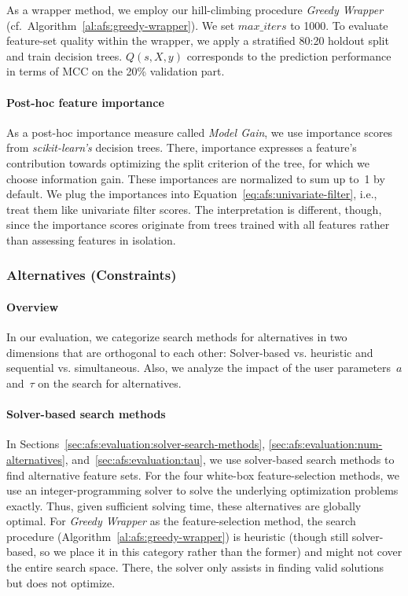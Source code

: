 \documentclass{article}
\theoremstyle{definition}
\begin{document}
As a wrapper method, we employ our hill-climbing procedure \emph{Greedy Wrapper} (cf.~Algorithm~\ref{al:afs:greedy-wrapper}).
We set $\mathit{max\_iters}$ to 1000.
To evaluate feature-set quality within the wrapper, we apply a stratified 80:20 holdout split and train decision trees.
$Q(s,X,y)$ corresponds to the prediction performance in terms of MCC on the 20\% validation part.

\paragraph{Post-hoc feature importance}

As a post-hoc importance measure called \emph{Model Gain}, we use importance scores from \emph{scikit-learn's} decision trees.
There, importance expresses a feature's contribution towards optimizing the split criterion of the tree, for which we choose information gain.
These importances are normalized to sum up to~1 by default.
We plug the importances into Equation~\ref{eq:afs:univariate-filter}, i.e., treat them like univariate filter scores.
The interpretation is different, though, since the importance scores originate from trees trained with all features rather than assessing features in isolation.

\subsubsection{Alternatives (Constraints)}
\label{sec:afs:experimental-design:approaches:alternatives}

\paragraph{Overview}

In our evaluation, we categorize search methods for alternatives in two dimensions that are orthogonal to each other:
Solver-based vs. heuristic and sequential vs. simultaneous.
Also, we analyze the impact of the user parameters~$a$ and~$\tau$ on the search for alternatives.

\paragraph{Solver-based search methods}

In Sections~\ref{sec:afs:evaluation:solver-search-methods}, \ref{sec:afs:evaluation:num-alternatives}, and~\ref{sec:afs:evaluation:tau}, we use solver-based search methods to find alternative feature sets.
For the four white-box feature-selection methods, we use an integer-programming solver to solve the underlying optimization problems exactly.
Thus, given sufficient solving time, these alternatives are globally optimal.
For \emph{Greedy Wrapper} as the feature-selection method, the search procedure (Algorithm~\ref{al:afs:greedy-wrapper}) is heuristic (though still solver-based, so we place it in this category rather than the former) and might not cover the entire search space.
There, the solver only assists in finding valid solutions but does not optimize.
\end{document}
